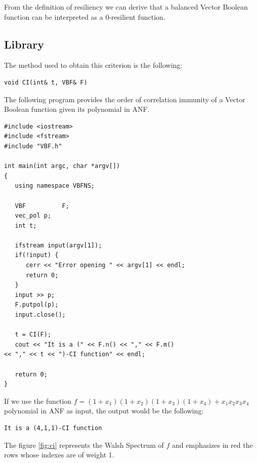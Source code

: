 From the definition of resiliency we can derive that a balanced Vector Boolean function can be interpreted as a $0$-resilient function.

\subsection{Library}

The method used to obtain this criterion is the following:

\begin{verbatim}
void CI(int& t, VBF& F)
\end{verbatim}

\begin{example}
The following program provides the order of correlation immunity of a Vector Boolean function given its polynomial in ANF.

\begin{verbatim}
#include <iostream>
#include <fstream>
#include "VBF.h"

int main(int argc, char *argv[])
{
   using namespace VBFNS;

   VBF          F;
   vec_pol p;
   int t;

   ifstream input(argv[1]);
   if(!input) {
      cerr << "Error opening " << argv[1] << endl;
      return 0;
   }
   input >> p;
   F.putpol(p);
   input.close();

   t = CI(F);
   cout << "It is a (" << F.n() << "," << F.m() 
<< "," << t << ")-CI function" << endl;

   return 0;
}
\end{verbatim}

If we use the function $f = (1+x_1)(1+x_2)(1+x_3)(1+x_4)+x_1x_2x_3x_4$ polynomial in ANF as input, the output would be the following:

\begin{verbatim}
It is a (4,1,1)-CI function
\end{verbatim}

The figure \ref{fig:ci} represents the Walsh Spectrum of $f$ and emphasizes in red the rows whose indexes are of weight 1.


\end{example}
